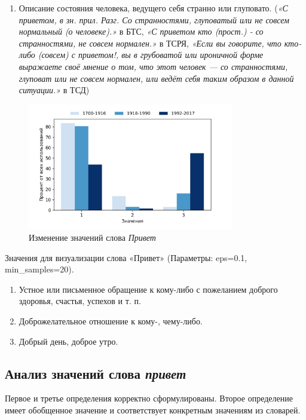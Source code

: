 \begin{enumerate}
    \item Описание состояния человека, ведущего себя странно или глуповато.
(\textit{«С приветом, в зн. прил. Разг. Со странностями, глуповатый или не совсем нормальный (о человеке).»} в БТС,
\textit{«С приветом кто (прост.) - со странностями, не совсем нормален.»} в ТСРЯ,
\textit{«Если вы говорите, что кто-либо (совсем) с приветом!, вы в грубоватой или ироничной форме
выражаете своё мнение о том, что этот человек — со странностями, глуповат или не совсем нормален,
или ведёт себя таким образом в данной ситуации.»} в ТСД)
\end{enumerate}

\begin{figure}[H]
	\centering
	\includegraphics[width=0.8\textwidth]{img/visualizations/privet_minimal}
	\caption{Изменение значений слова \textit{Привет}}
	\label{fig:Привет}
\end{figure}

Значения для визуализации слова «Привет» (Параметры: eps=0.1, min\_samples=20).

\begin{enumerate}
    \item Устное или письменное обращение к кому-либо с пожеланием доброго здоровья, счастья, успехов и т. п.
    \item Доброжелательное отношение к кому-, чему-либо.
    \item Добрый день, доброе утро.
\end{enumerate}

\subsection*{Анализ значений слова \textit{привет}}

Первое и третье определения корректно сформулированы.
Второе определение имеет обобщенное значение и соответствует конкретным значениям из словарей.

